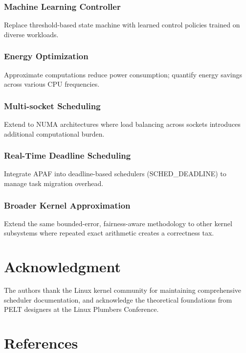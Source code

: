 \documentclass[conference]{IEEEtran}
\begin{document}
\subsubsection{Machine Learning Controller}
Replace threshold-based state machine with learned control policies trained on diverse workloads.

\subsubsection{Energy Optimization}
Approximate computations reduce power consumption; quantify energy savings across various CPU frequencies.

\subsubsection{Multi-socket Scheduling}
Extend to NUMA architectures where load balancing across sockets introduces additional computational burden.

\subsubsection{Real-Time Deadline Scheduling}
Integrate APAF into deadline-based schedulers (SCHED\_DEADLINE) to manage task migration overhead.

\subsubsection{Broader Kernel Approximation}
Extend the same bounded-error, fairness-aware methodology to other kernel subsystems where repeated exact arithmetic creates a correctness tax.

\section*{Acknowledgment}

The authors thank the Linux kernel community for maintaining comprehensive scheduler documentation, and acknowledge the theoretical foundations from PELT designers at the Linux Plumbers Conference.

\section*{References}
\end{document}
